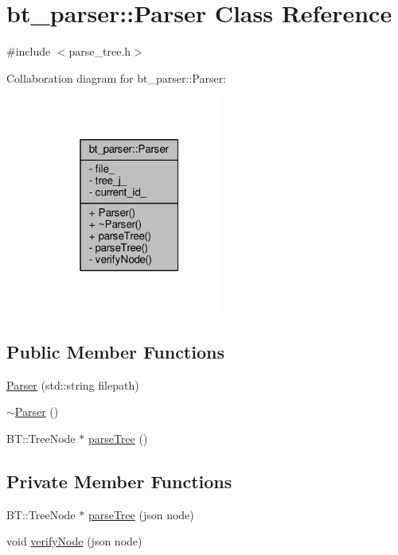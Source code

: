 \hypertarget{classbt__parser_1_1Parser}{\section{bt\-\_\-parser\-:\-:Parser Class Reference}
\label{classbt__parser_1_1Parser}
}


{\ttfamily \#include $<$parse\-\_\-tree.\-h$>$}



Collaboration diagram for bt\-\_\-parser\-:\-:Parser\-:\nopagebreak
\begin{figure}[H]
\begin{center}
\leavevmode
\includegraphics[width=172pt]{d2/d92/classbt__parser_1_1Parser__coll__graph}
\end{center}
\end{figure}
\subsection*{Public Member Functions}
\begin{DoxyCompactItemize}
\item 
\hyperlink{classbt__parser_1_1Parser_abcd6235386f006f36b56ceb08c898deb_abcd6235386f006f36b56ceb08c898deb}{Parser} (std\-::string filepath)
\item 
\hyperlink{classbt__parser_1_1Parser_a5a8992b935e01bac1fa36da4d20eb718_a5a8992b935e01bac1fa36da4d20eb718}{$\sim$\-Parser} ()
\item 
B\-T\-::\-Tree\-Node $\ast$ \hyperlink{classbt__parser_1_1Parser_a7c744cc625df4ce26fbaa3deba496737_a7c744cc625df4ce26fbaa3deba496737}{parse\-Tree} ()
\end{DoxyCompactItemize}
\subsection*{Private Member Functions}
\begin{DoxyCompactItemize}
\item 
B\-T\-::\-Tree\-Node $\ast$ \hyperlink{classbt__parser_1_1Parser_a30c924ebeff1273b8612c41bd5e7ffe2_a30c924ebeff1273b8612c41bd5e7ffe2}{parse\-Tree} (json node)
\item 
void \hyperlink{classbt__parser_1_1Parser_a67d8ea4c25f3088b8e5b18cc01837d1a_a67d8ea4c25f3088b8e5b18cc01837d1a}{verify\-Node} (json node)
\end{DoxyCompactItemize}
